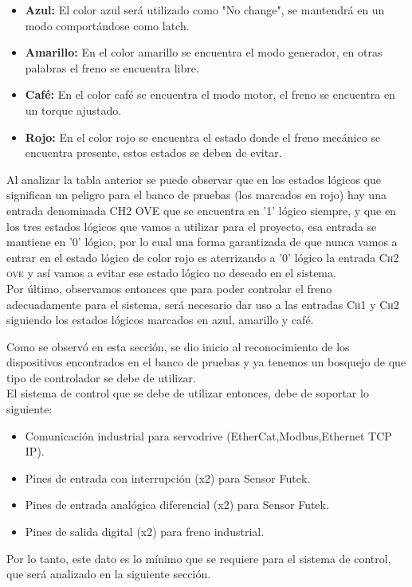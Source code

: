 \documentclass[12pt,titlepage]{article}
\begin{document}
\begin{itemize}
\item \textbf{Azul: } El color azul será utilizado como "No change", se mantendrá en un modo comportándose como latch. 
\item \textbf{Amarillo: } En el color amarillo se encuentra el modo generador, en otras palabras el freno se encuentra libre. 
\item \textbf{Café: } En el color café se encuentra el modo motor, el freno se encuentra en un torque ajustado. 
\item \textbf{Rojo: } En el color rojo se encuentra el estado donde el freno mecánico se encuentra presente, estos estados se deben de evitar. 
\end{itemize}

Al analizar la tabla anterior se puede observar que en los estados lógicos que significan un peligro para el banco de pruebas (los marcados en rojo) hay una entrada denominada \textsc{CH2 OVE} que se encuentra en '1' lógico siempre, y que en los tres estados lógicos que vamos a utilizar para el proyecto, esa entrada se mantiene en '0' lógico, por lo cual una forma garantizada de que nunca vamos a entrar en el estado lógico de color rojo es aterrizando a '0' lógico la entrada \textsc{Ch2 ove} y así vamos a evitar ese estado lógico no deseado en el sistema. \\ 

Por último, observamos entonces que para poder controlar el freno adecuadamente para el sistema, será necesario dar uso a las entradas \textsc{Ch1} y \textsc{Ch2} siguiendo los estados lógicos marcados en azul, amarillo y café.  

\newpage
Como se observó en esta sección, se dio inicio al reconocimiento de los dispositivos encontrados en el banco de pruebas y ya tenemos un bosquejo de que tipo de controlador se debe de utilizar.\\

El sistema de control que se debe de utilizar entonces, debe de soportar lo siguiente: 
\begin{itemize}
\item Comunicación industrial para servodrive (EtherCat,Modbus,Ethernet TCP IP).
\item Pines de entrada con interrupción (x2) para Sensor Futek.
\item Pines de entrada analógica diferencial (x2) para Sensor Futek.
\item Pines de salida digital (x2) para freno industrial.
\end{itemize} 

Por lo tanto, este dato es lo mínimo que se requiere para el sistema de control, que será analizado en la siguiente sección. \\ 
\end{document}
